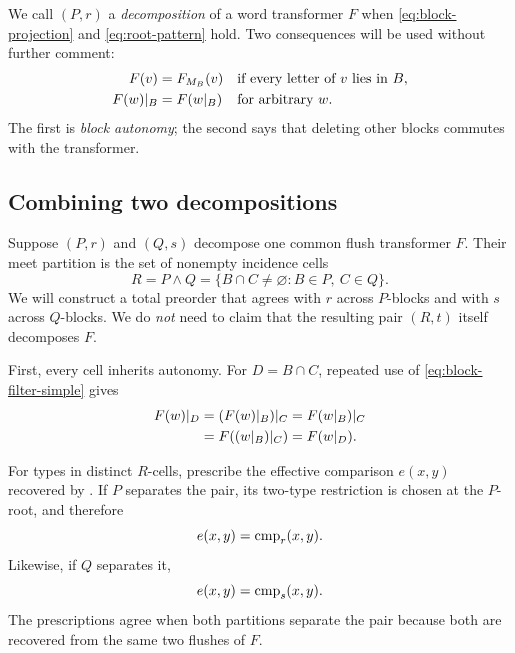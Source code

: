 We call \((P,r)\) a \emph{decomposition} of a word transformer \(F\) when
\autoref{eq:block-projection} and \autoref{eq:root-pattern} hold.  Two consequences will be used
without further comment:
\begin{align}
  F(v)&=F_{M_B}(v) &&\text{if every letter of \(v\) lies in \(B\)},
  \label{eq:block-autonomy-simple}\\
  F(w)\mathord{|}_{B}&=F(w\mathord{|}_{B}) &&\text{for arbitrary \(w\)}.
  \label{eq:block-filter-simple}
\end{align}
The first is \emph{block autonomy}; the second says that deleting other blocks
commutes with the transformer.

\subsection{Combining two decompositions}
\label{sec:meet}

Suppose \((P,r)\) and \((Q,s)\) decompose one common flush transformer \(F\).
Their meet partition is the set of nonempty incidence cells
\begin{equation}
 R=P\wedge Q
  =\{B\cap C\ne\varnothing:B\in P,\ C\in Q\}.
 \label{eq:meet-partition}
\end{equation}
We will construct a total preorder that agrees with \(r\) across \(P\)-blocks
and with \(s\) across \(Q\)-blocks.  We do \emph{not} need to claim that the
resulting pair \((R,t)\) itself decomposes \(F\).

First, every cell inherits autonomy.  For \(D=B\cap C\), repeated use of
\autoref{eq:block-filter-simple} gives
\begin{equation}
\begin{aligned}
 F(w)\mathord{|}_{D}
 &=(F(w)\mathord{|}_{B})\mathord{|}_{C}
  =F(w\mathord{|}_{B})\mathord{|}_{C}\\
 &=F((w\mathord{|}_{B})\mathord{|}_{C})
  =F(w\mathord{|}_{D}).
\end{aligned}
\label{eq:cell-autonomy}
\end{equation}

For types in distinct \(R\)-cells, prescribe the effective comparison
\(e(x,y)\) recovered by .  If \(P\) separates the pair, its
two-type restriction is chosen at the \(P\)-root, and therefore
\begin{equation}
 e(x,y)=\operatorname{cmp}_r(x,y).
 \label{eq:e-from-r}
\end{equation}
Likewise, if \(Q\) separates it,
\begin{equation}
 e(x,y)=\operatorname{cmp}_s(x,y).
 \label{eq:e-from-s}
\end{equation}
The prescriptions agree when both partitions separate the pair because both
are recovered from the same two flushes of \(F\).

